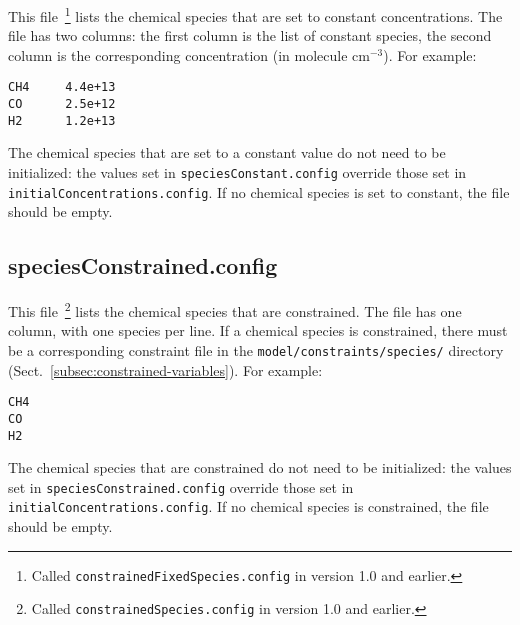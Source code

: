 This file~\footnote{Called \texttt{constrainedFixedSpecies.config} in
  version 1.0 and earlier.} lists the chemical species that are set to
constant concentrations. The file has two columns: the first column is
the list of constant species, the second column is the corresponding
concentration (in molecule cm$^{-3}$). For example:

\begin{verbatim}
CH4     4.4e+13
CO      2.5e+12
H2      1.2e+13
\end{verbatim}

The chemical species that are set to a constant value do not need to
be initialized: the values set in \texttt{speciesConstant.config}
override those set in \texttt{initialConcentrations.config}. If no
chemical species is set to constant, the file should be empty.

\subsection{speciesConstrained.config} \label{subsec:speciesconstrained}

This file~\footnote{Called \texttt{constrainedSpecies.config} in
  version 1.0 and earlier.} lists the chemical species that are
constrained. The file has one column, with one species per line. If a
chemical species is constrained, there must be a corresponding
constraint file in the \texttt{model/constraints/species/} directory
(Sect.~\ref{subsec:constrained-variables}). For example:

\begin{verbatim}
CH4
CO
H2
\end{verbatim}

The chemical species that are constrained do not need to be
initialized: the values set in \texttt{speciesConstrained.config}
override those set in \texttt{initialConcentrations.config}. If no
chemical species is constrained, the file should be empty.
